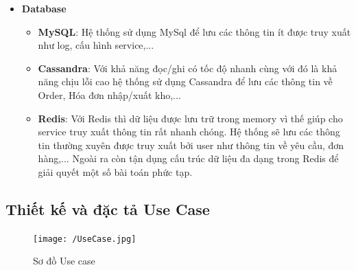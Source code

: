 \begin{itemize}
				\item \textbf{Database}
				\begin{itemize}
					\item \textbf{MySQL}: Hệ thống sử dụng MySql để lưu các thông tin ít được truy xuất như log, cấu hình service,...
					\item \textbf{Cassandra}: Với khả năng đọc/ghi có tốc độ nhanh cùng với đó là khả năng chịu lỗi cao hệ thống sử dụng Cassandra để lưu các thông tin về Order, Hóa đơn nhập/xuất kho,...
					\item \textbf{Redis}: Với Redis thì dữ liệu được lưu trữ trong memory vì thế giúp cho service truy xuất thông tin rất nhanh chóng. Hệ thống sẽ lưu các thông tin thường xuyên được truy xuất bởi user như thông tin về yêu cầu, đơn hàng,... Ngoài ra còn tận dụng cấu trúc dữ liệu đa dạng trong Redis để giải quyết một số bài toán phức tạp. 
				\end{itemize}
		
		\end{itemize}

\newpage
\subsection{Thiết kế và đặc tả Use Case}

\begin{figure}[H]
	\texttt{[image: /UseCase.jpg]}
	\centering
	\linebreak
	\caption{Sơ đồ Use case}
\end{figure}

	\newpage
	
